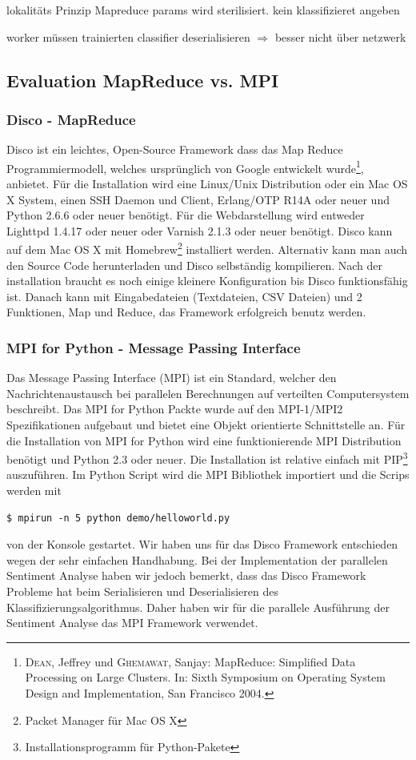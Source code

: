 \documentclass[12pt, oneside]{report}   	%
\begin{document}
lokalitäts Prinzip Mapreduce params wird sterilisiert. kein klassifizieret angeben

worker müssen trainierten classifier deserialisieren $\Rightarrow$ besser nicht über netzwerk
\subsection{Evaluation MapReduce vs. MPI}
\subsubsection{Disco - MapReduce}
Disco ist ein leichtes, Open-Source Framework dass das Map Reduce Programmiermodell, welches ursprünglich von Google entwickelt wurde\footnote{\textsc{Dean}, Jeffrey und \textsc{Ghemawat}, Sanjay: MapReduce: Simplified Data Processing on Large Clusters. In: Sixth Symposium on Operating System Design and Implementation, San Francisco 2004.}, anbietet. Für die Installation wird eine Linux/Unix Distribution oder ein Mac OS X System, einen SSH Daemon und Client, Erlang/OTP R14A oder neuer und Python 2.6.6 oder neuer benötigt. Für die Webdarstellung wird entweder Lighttpd 1.4.17 oder neuer oder Varnish 2.1.3 oder neuer benötigt. Disco kann auf dem Mac OS X mit Homebrew\footnote{Packet Manager für Mac OS X} installiert werden. Alternativ kann man auch den Source Code herunterladen und Disco selbständig kompilieren. Nach der installation braucht es noch einige kleinere Konfiguration bis Disco funktionsfähig ist. Danach kann mit Eingabedateien (Textdateien, CSV Dateien) und 2 Funktionen, Map und Reduce, das Framework erfolgreich benutz werden.
\subsubsection{MPI for Python - Message Passing Interface}
Das Message Passing Interface (MPI) ist ein Standard, welcher den Nachrichtenaustausch bei parallelen Berechnungen auf verteilten Computersystem beschreibt. Das MPI for Python Packte wurde auf den MPI-1/MPI2 Spezifikationen aufgebaut und bietet eine Objekt orientierte Schnittstelle an. Für die Installation von MPI for Python wird eine funktionierende MPI Distribution benötigt und Python 2.3 oder neuer. Die Installation ist relative einfach mit PIP\footnote{Installationsprogramm für Python-Pakete} auszuführen. Im Python Script wird die MPI Bibliothek importiert und die Scrips werden mit
\begin{lstlisting}
$ mpirun -n 5 python demo/helloworld.py
\end{lstlisting}
von der Konsole gestartet.\newline{}
Wir haben uns für das Disco Framework entschieden wegen der sehr einfachen Handhabung. Bei der Implementation der parallelen Sentiment Analyse haben wir jedoch bemerkt, dass das Disco Framework Probleme hat beim Serialisieren und Deserialisieren des Klassifizierungsalgorithmus. Daher haben wir für die parallele Ausführung der Sentiment Analyse das MPI Framework verwendet.
\end{document}
